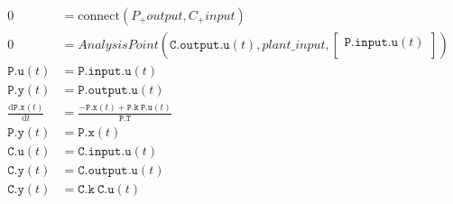 \begin{align}
0 &= \mathrm{connect}\left( P_{+}output, C_{+}input \right) \\
0 &= AnalysisPoint\left( \mathtt{C.output.u}\left( t \right), plant\_input, \left[
\begin{array}{c}
\mathtt{P.input.u}\left( t \right) \\
\end{array}
\right] \right) \\
\mathtt{P.u}\left( t \right) &= \mathtt{P.input.u}\left( t \right) \\
\mathtt{P.y}\left( t \right) &= \mathtt{P.output.u}\left( t \right) \\
\frac{\mathrm{d}\mathtt{P.x}\left( t \right)}{\mathrm{d}t} &= \frac{ - \mathtt{P.x}\left( t \right) + \mathtt{P.k} ~ \mathtt{P.u}\left( t \right)}{\mathtt{P.T}} \\
\mathtt{P.y}\left( t \right) &= \mathtt{P.x}\left( t \right) \\
\mathtt{C.u}\left( t \right) &= \mathtt{C.input.u}\left( t \right) \\
\mathtt{C.y}\left( t \right) &= \mathtt{C.output.u}\left( t \right) \\
\mathtt{C.y}\left( t \right) &= \mathtt{C.k} ~ \mathtt{C.u}\left( t \right)
\end{align}
